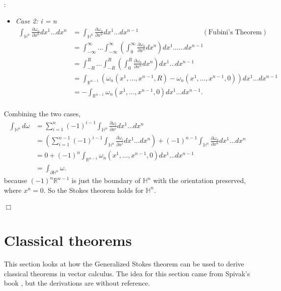 \documentclass{article}
\theoremstyle{definition}
\theoremstyle{named}
\def\endproofmark{$\Box$}
\newenvironment{proof}{\par\noindent{\bf Proof}:}{\endproofmark\smallskip}
\begin{document}
\begin{proof}
\begin{itemize}
\begin{itemize}
            \item \emph{Case 2: i = n}
            \begin{align*}
                \int_{\mathbb{H}^n}   \frac{\partial \omega_n}{\partial x^n} dx^1 \ldots dx^n &= \int_{\mathbb{H}^n}   \frac{\partial \omega_n}{\partial x^n} dx^1 \ldots dx^{n-1}  \ \ \ \ \ \ \ \ \ \ \ \ \ \ \ \ \ \ \ \ \ \ \ \ \ \ \ \ \ \ \ \ \ \ \ \ \  \ \ \ \ \  (\text{Fubini's Theorem})  \\
                &=\int_{-\infty}^{\infty} \ldots \int_{-\infty}^{\infty} \left(\int_{0}^{\infty} \frac{\partial \omega_n}{\partial x^n} dx^n\right) dx^1 \ldots \ldots dx^{n-1} \\
                &= \int_{-R}^{R} \ldots \int_{-R}^{R} \left(\int_{0}^{R} \frac{\partial \omega_n}{\partial x^n} dx^n\right) dx^1 \ldots dx^{n-1} \\
                &= \int_{\mathbb{R}^{n-1}} \left( \omega_n(x^1, \ldots, x^{n-1}, R) - \omega_n(x^1, \ldots, x^{n-1}, 0) \right) dx^1 \ldots dx^{n-1} \\
                &= -\int_{\mathbb{R}^{n-1}} \omega_n(x^1, \ldots, x^{n-1}, 0) dx^1 \ldots dx^{n-1}.   \\
            \end{align*}
        \end{itemize}
        Combining the two cases, 
        \begin{align*}
            \int_{\mathbb{H}^n} d\omega &= \sum_{i=1}^n (-1)^{i-1} \int_{\mathbb{H}^n}   \frac{\partial \omega_i}{\partial x^i} dx^1 \ldots dx^n \\
            &= \left( \sum_{i=1}^{n-1} (-1)^{i-1} \int_{\mathbb{H}^n}   \frac{\partial \omega_i}{\partial x^i} dx^1 \ldots dx^n \right) + (-1)^{n-1} \int_{\mathbb{H}^n}   \frac{\partial \omega_n}{\partial x^n} dx^1 \ldots dx^n \\
            &= 0 + (-1)^n \int_{\mathbb{R}^{n-1}} \omega_n(x^1, \ldots, x^{n-1}, 0) dx^1 \ldots dx^{n-1} \\
            &= \int_{\partial \mathbb{H}^n} \omega.
        \end{align*}
        because $(-1)^n \mathbb{R}^{n-1}$ is just the boundary of $\mathbb{H}^n$ with the orientation preserved, where $x^n = 0$. So the Stokes theorem holds for $\mathbb{H}^n$.
    \end{itemize}
\end{proof}
\section{Classical theorems}
This section looks at how the Generalized Stokes theorem can be used to derive classical theorems in vector calculus. The idea for this section came from Spivak's book \cite{spivak1971calculus}, but the derivations are without reference.
\end{document}
